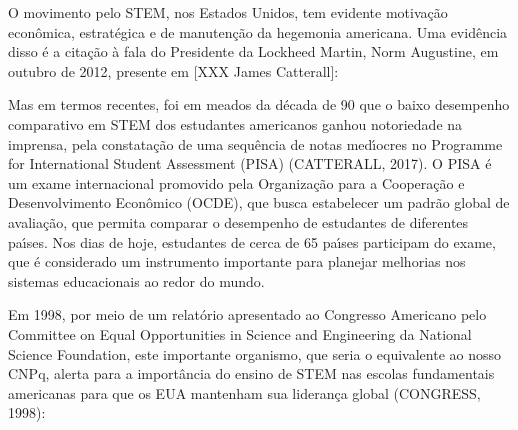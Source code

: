\documentclass[
12pt,		%
openright,	%
twoside,  %
a4paper,			%
chapter=TITLE,		%
english,			%
french,				%
spanish,			%
brazil				%
]{USPSC-classe/USPSC}
\begin{document}
O movimento pelo STEM, nos Estados Unidos, tem evidente motiva\c{c}\~ao econ\^omica, estrat\'egica e de manuten\c{c}\~ao da hegemonia americana. Uma evid\^encia disso \'e a cita\c{c}\~ao \`a fala do Presidente da Lockheed Martin, Norm Augustine, em outubro de 2012, presente em [XXX James Catterall]:


















\noindent\begin{center}\mbox{\centering{}}\end{center}


Mas em termos recentes, foi em meados da d\'ecada de 90 que o baixo desempenho comparativo em STEM dos estudantes americanos ganhou notoriedade na imprensa, pela constata\c{c}\~ao de uma sequ\^encia de notas med\'{\i}ocres no Programme for International Student Assessment (PISA)  (CATTERALL, 2017). O PISA \'e um exame internacional promovido pela Organiza\c{c}\~ao para a Coopera\c{c}\~ao e Desenvolvimento Econ\^omico (OCDE), que busca estabelecer um padr\~ao global de avalia\c{c}\~ao, que permita comparar o desempenho de estudantes de diferentes pa\'{\i}ses. Nos dias de hoje, estudantes de cerca de 65 pa\'{\i}ses participam do exame, que \'e considerado um instrumento importante para planejar melhorias nos sistemas educacionais ao redor do mundo.

















Em 1998, por meio de um relat\'orio apresentado ao Congresso Americano pelo Committee on Equal Opportunities in Science and Engineering da National Science Foundation, este importante organismo, que seria o equivalente ao nosso CNPq, alerta para a import\^ancia do ensino de STEM nas escolas fundamentais americanas para que os EUA mantenham sua lideran\c{c}a global  (CONGRESS, 1998):
\end{document}
